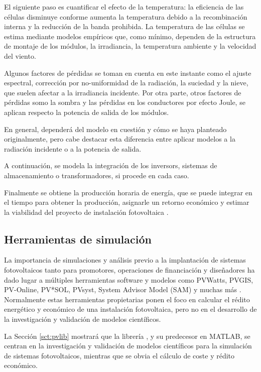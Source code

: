 El siguiente paso es cuantificar el efecto de la temperatura: la eficiencia de las células disminuye conforme aumenta la temperatura debido a la \gls{recombinación interna} y la reducción de la \gls{banda prohibida}. La temperatura de las células se estima mediante modelos empíricos que, como mínimo, dependen de la estructura de montaje de los \glspl{módulo}, la irradiancia, la temperatura ambiente y la velocidad del viento.

Algunos factores de pérdidas se toman en cuenta en este instante como el \gls{ajuste espectral}, corrección por no-uniformidad de la radiación, la suciedad y la nieve, que suelen afectar a la irradiancia incidente. Por otra parte, otros factores de pérdidas somo la \gls{sombra} y las pérdidas en los conductores por \gls{efecto Joule}, se aplican respecto la potencia de salida de los módulos.

En general, dependerá del modelo en cuestión y cómo se haya planteado originalmente, pero cabe destacar esta diferencia entre aplicar modelos a la radiación incidente o a la potencia de salida.

A continuación, se modela la integración de los \glspl{inversor}, \gls{sistemas de almacenamiento} o \gls{transformadores}, si procede en cada caso.

Finalmente se obtiene la producción horaria de energía, que se puede integrar en el tiempo para obtener la producción, asignarle un retorno económico y estimar la viabilidad del proyecto de instalación fotovoltaica \cite{Rosa-Clot_Tina_2020}.

\subsection{Herramientas de simulación}

La importancia de simulaciones y análisis previo a la implantación de sistemas fotovoltaicos tanto para promotores, operaciones de financiación y diseñadores ha dado lugar a múltiples herramientas \gls{software} y modelos como PVWatts, PVGIS, PV-Online, PV*SOL, PVsyst, System Advisor Model (SAM) y muchas más \cite{stein_models_2009, Kumar_2017}. Normalmente estas herramientas propietarias ponen el foco en calcular el rédito energético y económico de una instalación fotovoltaica, pero no en el desarrollo de la investigación y validación de modelos científicos.

La Sección \ref{sct:pvlib} mostrará que la librería \pvlibpy{}, y su predecesor en \gls{MATLAB}, se centran en la investigación y validación de modelos científicos para la simulación de sistemas fotovoltaicos, mientras que se obvia el cálculo de coste y rédito económico.

